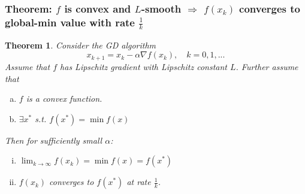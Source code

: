 \documentclass[11pt,a4paper]{article}
\newtheorem{theorem}{Theorem}
\begin{document}
\subsubsection{Theorem: $f$ is convex and $L$-smooth $\Rightarrow$ $f(x_k)$ converges to global-min value with rate $\frac{1}{k}$}
\begin{theorem}
Consider the GD algorithm $$x_{k+1}=x_k-\alpha \nabla f(x_k),\quad k=0,1,...$$
Assume that $f$ has Lipschitz gradient with Lipschitz constant $L$. Further assume that
\begin{enumerate}[(a)]
    \item $f$ is a convex function.
    \item $\exists x^*$ s.t. $f(x^*)=\min f(x)$
\end{enumerate}
Then for sufficiently small $\alpha$:
\begin{enumerate}[(i)]
    \item $\lim_{k \rightarrow \infty} f(x_k)=\min f(x)=f(x^*)$
    \item $f(x_k)$ converges to $f(x^*)$ at rate $\frac{1}{k}$.
\end{enumerate}
\end{theorem}
\end{document}
